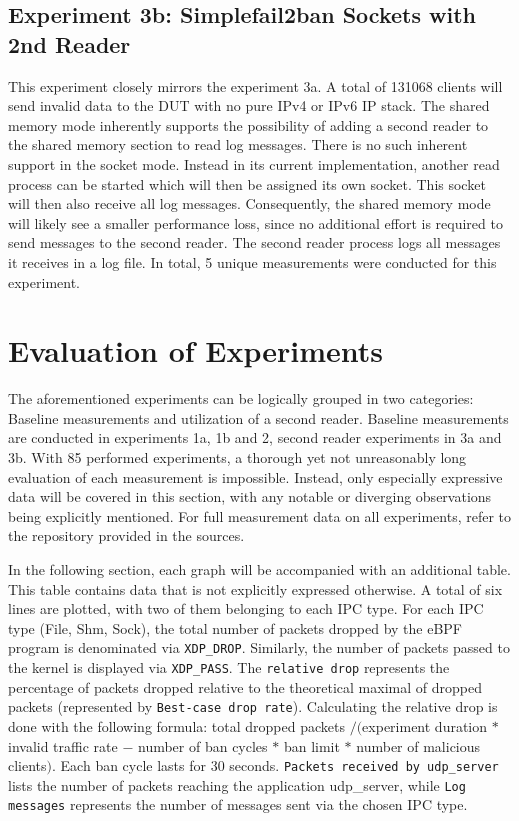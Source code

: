 \subsection{Experiment 3b: Simplefail2ban Sockets with 2nd Reader}
This experiment closely mirrors the experiment 3a.
A total of 131068 clients will send invalid data to the \ac{DUT} with no pure IPv4 or IPv6 \ac{IP} stack.
The shared memory mode inherently supports the possibility of adding a second reader to the shared memory section to read log messages.
There is no such inherent support in the socket mode.
Instead in its current implementation, another read process can be started which will then be assigned its own socket.
This socket will then also receive all log messages.
Consequently, the shared memory mode will likely see a smaller performance loss, since no additional effort is required to send messages to the second reader. 
The second reader process logs all messages it receives in a log file.
In total, 5 unique measurements were conducted for this experiment.

\newpage
\section{Evaluation of Experiments}
The aforementioned experiments can be logically grouped in two categories\@: Baseline measurements and utilization of a second reader.
Baseline measurements are conducted in experiments 1a, 1b and 2, second reader experiments in 3a and 3b.
With 85 performed experiments, a thorough yet not unreasonably long evaluation of each measurement is impossible.
Instead, only especially expressive data will be covered in this section, with any notable or diverging observations being explicitly mentioned.
For full measurement data on all experiments, refer to the repository provided in the sources\cite{git:repoOfThesis}.

In the following section, each graph will be accompanied with an additional table.
This table contains data that is not explicitly expressed otherwise.
A total of six lines are plotted, with two of them belonging to each \ac{IPC} type.
For each \ac{IPC} type (File, Shm, Sock), the total number of packets dropped by the \ac{eBPF} program is denominated via \texttt{XDP\_DROP}.
Similarly, the number of packets passed to the kernel is displayed via \texttt{XDP\_PASS}.
The \texttt{relative drop} represents the percentage of packets dropped relative to the theoretical maximal of dropped packets (represented by \texttt{Best-case drop rate}).
Calculating the relative drop is done with the following formula:
total dropped packets $/ ($experiment duration $*$ invalid traffic rate $-$ number of ban cycles $*$ ban limit $*$ number of malicious clients$)$.
Each ban cycle lasts for 30 seconds.
\texttt{Packets received by udp\_server} lists the number of packets reaching the application udp\_server, while \texttt{Log messages} represents the number of messages sent via the chosen \ac{IPC} type.

